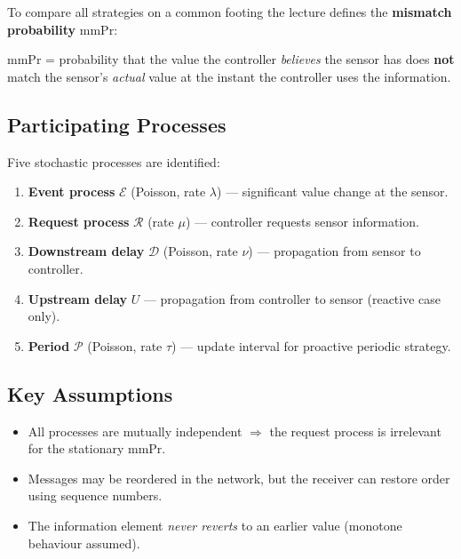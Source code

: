 To compare all strategies on a common footing the lecture defines the
\textbf{mismatch probability} $\mathrm{mmPr}$:
 
\begin{mdframed}[backgroundcolor=lightgray, linecolor=aaublue, linewidth=1.5pt,
  leftline=true, rightline=false, topline=false, bottomline=false,
  innerleftmargin=10pt, innertopmargin=6pt, innerbottommargin=6pt]
$\mathrm{mmPr}$ = probability that the value the controller \emph{believes}
the sensor has does \textbf{not} match the sensor's \emph{actual} value at the
instant the controller uses the information.
\end{mdframed}
 
\subsection{Participating Processes}
 
Five stochastic processes are identified:
 
\begin{enumerate}[leftmargin=2em]
  \item \textbf{Event process} $\mathcal{E}$ (Poisson, rate $\lambda$) ---
        significant value change at the sensor.
  \item \textbf{Request process} $\mathcal{R}$ (rate $\mu$) --- controller
        requests sensor information.
  \item \textbf{Downstream delay} $\mathcal{D}$ (Poisson, rate $\nu$) ---
        propagation from sensor to controller.
  \item \textbf{Upstream delay} $U$ --- propagation from controller to sensor
        (reactive case only).
  \item \textbf{Period} $\mathcal{P}$ (Poisson, rate $\tau$) --- update
        interval for proactive periodic strategy.
\end{enumerate}
 
\subsection{Key Assumptions}
 
\begin{itemize}[leftmargin=2em]
  \item All processes are mutually independent $\Rightarrow$ the request
        process is irrelevant for the stationary $\mathrm{mmPr}$.
  \item Messages may be reordered in the network, but the receiver can restore
        order using sequence numbers.
  \item The information element \emph{never reverts} to an earlier value
        (monotone behaviour assumed).
\end{itemize}
 
